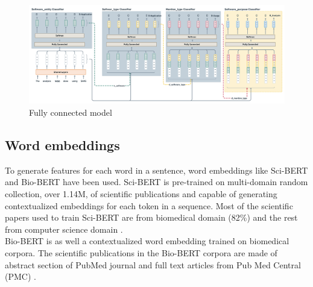 \begin{figure}[htbp]
	\centering
	\includegraphics[width=1\textwidth]{4.graphics/figures/ch_5/fully_connected_model}
	\caption{Fully connected model }
	\label{fig:chapter05:setup}
\end{figure}

\subsection{Word embeddings}
\label{sec:chapter05:DLModels:wemb}

To generate features for each word in a sentence, word embeddings like Sci-BERT and Bio-BERT have been used. Sci-BERT is pre-trained on multi-domain random collection, over 1.14M, of scientific publications and capable of generating contextualized embeddings for each token in a sequence. Most of the scientific papers used to train Sci-BERT are from biomedical domain (82\%) and the rest from computer science domain \citep{beltagy2019scibert}. \\

Bio-BERT is as well a contextualized word embedding trained on biomedical corpora. The scientific publications in the Bio-BERT corpora are made of abstract section of PubMed journal and full text articles from Pub Med Central (PMC) \citep{li2019fine}. 


